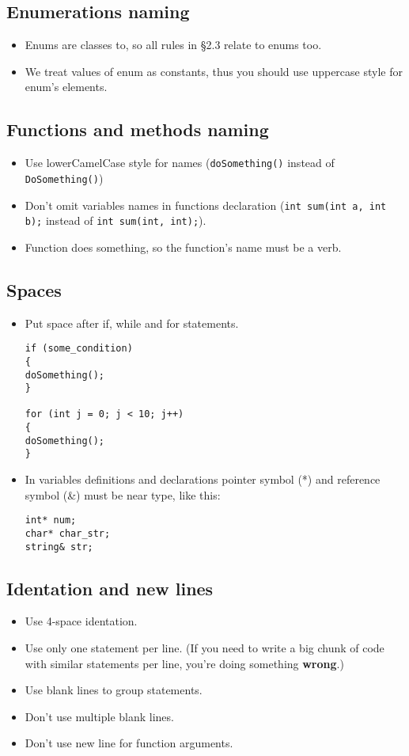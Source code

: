 \documentclass[12pt]{article}
\newcommand{\code}[1]{\colorbox{verylightgray}{\lstinline!#1!}}
\begin{document}
		\subsection{Enumerations naming}
			\begin{itemize}
				\item Enums are classes to, so all rules in \S2.3 relate to enums too.
				\item We treat values of enum as constants, thus you should use uppercase style for enum's elements.
			\end{itemize}

		\subsection{Functions and methods naming}
			\begin{itemize}
				\item Use lowerCamelCase style for names (\code{doSomething()} instead of \code{DoSomething()})
				\item Don't omit variables names in functions declaration (\code{int sum(int a, int b);} instead of \code{int sum(int, int);}).
				\item Function does something, so the function's name must be a verb.
			\end{itemize}

        \subsection{Spaces}
            \begin{itemize}
                \item Put space after if, while and for statements.
\begin{lstlisting}
if (some_condition)
{
doSomething();
}

for (int j = 0; j < 10; j++)
{
doSomething();
}
\end{lstlisting}
                \item In variables definitions and declarations pointer symbol
                    (*) and reference symbol (\&) must be near type, like this:
\begin{lstlisting}
int* num;
char* char_str;
string& str;
\end{lstlisting}
            \end{itemize}

		\subsection{Identation and new lines}
			\begin{itemize}
				\item Use 4-space identation.
				\item Use only one statement per line. (If you need to write a big chunk of code with similar statements per line, you're doing something \textbf{wrong}.)
				\item Use blank lines to group statements.
				\item Don't use multiple blank lines.
				\item Don't use new line for function arguments.
			\end{itemize}
\end{document}
